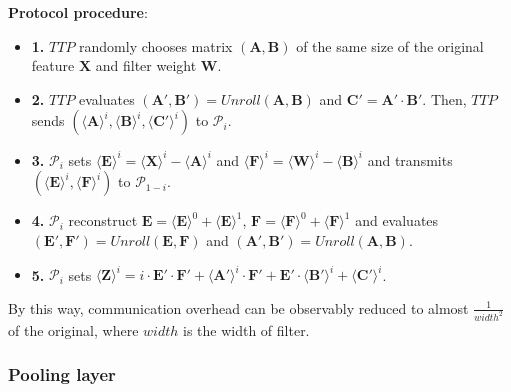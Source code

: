 \documentclass[letterpaper]{article} %
\begin{document}
    \textbf{Protocol procedure}:
    \begin{itemize}
        \item \textbf{1.} $TTP$ randomly chooses matrix $(\mathbf{A},\mathbf{B})$ of the same size of the original feature $\mathbf{X}$ and filter weight $\mathbf{W}$.
        \item \textbf{2.} $TTP$ evaluates $( \mathbf{A}',\mathbf{B}')=Unroll(\mathbf{A},\mathbf{B})$ and $\mathbf{C}' =\mathbf{A}'\cdot \mathbf{B}' $.
        Then, $TTP$ sends $(\langle \mathbf{A}\rangle ^{i},\langle \mathbf{B}\rangle ^{i},\langle \mathbf{C}'\rangle ^{i})$ to $\mathcal{P}_{i}$.
        \item \textbf{3.} $\mathcal{P}_{i}$ sets $\langle \mathbf{E}\rangle ^{i}=\langle \mathbf{X}\rangle ^{i}-\langle \mathbf{A}\rangle ^{i}$
        and $\langle \mathbf{F}\rangle ^{i}=\langle \mathbf{W}\rangle ^{i}-\langle \mathbf{B}\rangle ^{i}$
        and transmits $(\langle \mathbf{E}\rangle ^{i},\langle \mathbf{F}\rangle ^{i})$ to $\mathcal{P}_{1-i}$.
        \item \textbf{4.} $\mathcal{P}_{i}$ reconstruct $\mathbf{E} = \langle \mathbf{E}\rangle ^{0}+\langle \mathbf{E}\rangle ^{1}$,
        $\mathbf{F} = \langle \mathbf{F}\rangle ^{0}+\langle \mathbf{F}\rangle ^{1}$
        and evaluates $(\mathbf{E}',\mathbf{F}')=Unroll(\mathbf{E},\mathbf{F})$ and $(\mathbf{A}',\mathbf{B}')=Unroll(\mathbf{A},\mathbf{B})$.
        \item \textbf{5.} $\mathcal{P}_{i}$ sets
        $\langle \mathbf{Z}\rangle^{i}=i\cdot \mathbf{E}' \cdot \mathbf{F}' +
        \langle \mathbf{A}'\rangle^{i} \cdot \mathbf{F}' + \mathbf{E}' \cdot \langle \mathbf{B}'\rangle^{i} + \langle \mathbf{C}'\rangle^{i}$.

    \end{itemize}

    By this way, communication overhead can be observably reduced to almost $ \frac{1}{width^{2}} $ of the original,
    where $width$ is the width of filter.


    \subsubsection{Pooling layer}
\end{document}
